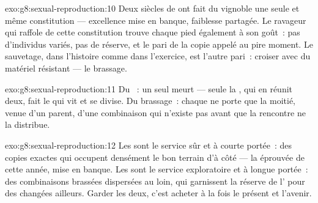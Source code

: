 \begin{solution}{exo:g8:sexual-reproduction:10}
Deux siècles de  ont fait du vignoble une seule et même
constitution --- excellence mise en banque, faiblesse partagée. Le
ravageur qui raffole de cette constitution trouve chaque pied
également à son goût~: pas d'individus variés, pas de réserve, et le
pari de la copie appelé au pire moment. Le sauvetage, dans
l'histoire comme dans l'exercice, est l'autre pari~: croiser avec du
matériel résistant --- le brassage.
\end{solution}

\begin{solution}{exo:g8:sexual-reproduction:11}
Du ~: un  seul meurt --- seule la , qui en
réunit deux, fait le  qui vit et se divise. Du brassage~:
chaque  ne porte que la moitié, venue d'un parent, d'une
combinaison qui n'existe pas avant que la rencontre ne la
distribue.
\end{solution}

\begin{solution}{exo:g8:sexual-reproduction:12}
Les  sont le service sûr et à courte portée~: des copies
exactes qui occupent densément le bon terrain d'à côté --- la 
éprouvée de cette année, mise en banque. Les  sont le service
exploratoire et à longue portée~: des combinaisons brassées
dispersées au loin, qui garnissent la réserve de l' pour des
 changées ailleurs. Garder les deux, c'est acheter à la
fois le présent et l'avenir.
\end{solution}

